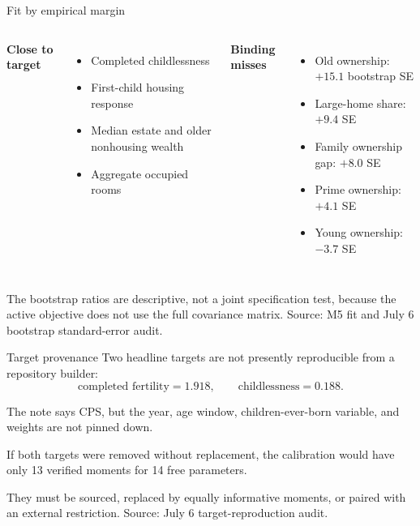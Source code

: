 \documentclass[aspectratio=169,11pt]{beamer}
\newcommand{\source}[1]{\vfill{\color{Muted}\tiny Source: #1}}
\newcommand{\good}[1]{{\color{Green}\textbf{#1}}}
\newcommand{\bad}[1]{{\color{Terra}\textbf{#1}}}
\newcommand{\tightitems}{\setlength{\itemsep}{0.55em}}
\begin{document}
\begin{frame}{Fit by empirical margin}
  \begin{columns}[T,onlytextwidth]
      \large\good{Close to target}
      \begin{itemize}\tightitems
        \item Completed childlessness
        \item First-child housing response
        \item Median estate and older nonhousing wealth
        \item Aggregate occupied rooms
      \end{itemize}
      \large\bad{Binding misses}
      \begin{itemize}\tightitems
        \item Old ownership: $+15.1$ bootstrap SE
        \item Large-home share: $+9.4$ SE
        \item Family ownership gap: $+8.0$ SE
        \item Prime ownership: $+4.1$ SE
        \item Young ownership: $-3.7$ SE
      \end{itemize}
  \end{columns}

  \vspace{0.7em}
  The bootstrap ratios are descriptive, not a joint specification test, because the active objective does not use the full covariance matrix.
  \source{M5 fit and July 6 bootstrap standard-error audit.}
\end{frame}

\begin{frame}{Target provenance}
  \large
  Two headline targets are not presently reproducible from a repository builder:
  \[
    \text{completed fertility}=1.918,
    \qquad
    \text{childlessness}=0.188.
  \]

  The note says CPS, but the year, age window, children-ever-born variable, and weights are not pinned down.

  \vspace{0.7em}
  If both targets were removed without replacement, the calibration would have only 13 verified moments for 14 free parameters.

  \alert{They must be sourced, replaced by equally informative moments, or paired with an external restriction.}
  \source{July 6 target-reproduction audit.}
\end{frame}
\end{document}
